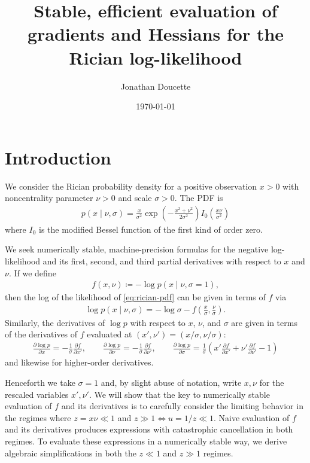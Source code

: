 \documentclass{article}
\title{Stable, efficient evaluation of gradients and Hessians for the Rician log-likelihood}
\author{Jonathan Doucette}
\date{\today}
\begin{document}
\maketitle

\section{Introduction}

We consider the Rician probability density for a positive observation $x>0$ with noncentrality parameter $\nu>0$ and scale $\sigma>0$.
The PDF is
%
\begin{align}
  p(x \mid \nu, \sigma) = \frac{x}{\sigma^2} \exp\left(-\frac{x^2+\nu^2}{2\sigma^2}\right) I_0\left(\frac{x\nu}{\sigma^2}\right) \label{eq:rician-pdf}
\end{align}
%
where $I_0$ is the modified Bessel function of the first kind of order zero.

We seek numerically stable, machine-precision formulas for the negative log-likelihood and its first, second, and third partial derivatives with respect to $x$ and $\nu$.
If we define
%
\begin{align}
  f(x, \nu) \coloneqq -\log p(x \mid \nu, \sigma = 1),
\end{align}
%
then the log of the likelihood of \cref{eq:rician-pdf} can be given in terms of $f$ via
%
\begin{align}
  \log p(x \mid \nu, \sigma) = -\log\sigma - f\left(\frac{x}{\sigma}, \frac{\nu}{\sigma}\right).
\end{align}
%
Similarly, the derivatives of $\log p$ with respect to $x$, $\nu$, and $\sigma$ are given in terms of the derivatives of $f$ evaluated at $(x', \nu') = (x / \sigma, \nu / \sigma)$:
%
\begin{align}
  \frac{\partial \log p}{\partial x}      = -\frac{1}{\sigma} \frac{\partial f}{\partial x'},                                                                                        \qquad
  \frac{\partial \log p}{\partial \nu}    = -\frac{1}{\sigma} \frac{\partial f}{\partial \nu'},                                                                                      \qquad
  \frac{\partial \log p}{\partial \sigma} = \frac{1}{\sigma} \left( x' \frac{\partial f}{\partial x'} + \nu' \frac{\partial f}{\partial \nu'} - 1 \right)
\end{align}
%
and likewise for higher-order derivatives.

Henceforth we take $\sigma=1$ and, by slight abuse of notation, write $x, \nu$ for the rescaled variables $x', \nu'$.
We will show that the key to numerically stable evaluation of $f$ and its derivatives is to carefully consider the limiting behavior in the regimes where $z = x\nu \ll 1$ and $z \gg 1 \Leftrightarrow u=1/z \ll 1$.
Naive evaluation of $f$ and its derivatives produces expressions with catastrophic cancellation in both regimes.
To evaluate these expressions in a numerically stable way, we derive algebraic simplifications in both the $z \ll 1$ and $z \gg 1$ regimes.
\end{document}
